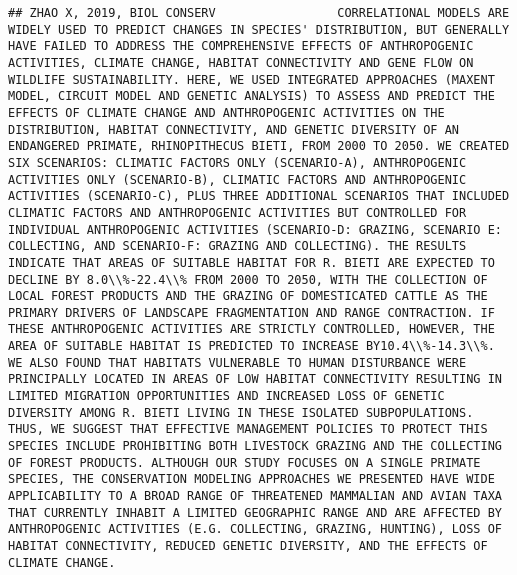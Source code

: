 \documentclass[]{article}
\begin{document}
\begin{verbatim}
## ZHAO X, 2019, BIOL CONSERV                 CORRELATIONAL MODELS ARE WIDELY USED TO PREDICT CHANGES IN SPECIES' DISTRIBUTION, BUT GENERALLY HAVE FAILED TO ADDRESS THE COMPREHENSIVE EFFECTS OF ANTHROPOGENIC ACTIVITIES, CLIMATE CHANGE, HABITAT CONNECTIVITY AND GENE FLOW ON WILDLIFE SUSTAINABILITY. HERE, WE USED INTEGRATED APPROACHES (MAXENT MODEL, CIRCUIT MODEL AND GENETIC ANALYSIS) TO ASSESS AND PREDICT THE EFFECTS OF CLIMATE CHANGE AND ANTHROPOGENIC ACTIVITIES ON THE DISTRIBUTION, HABITAT CONNECTIVITY, AND GENETIC DIVERSITY OF AN ENDANGERED PRIMATE, RHINOPITHECUS BIETI, FROM 2000 TO 2050. WE CREATED SIX SCENARIOS: CLIMATIC FACTORS ONLY (SCENARIO-A), ANTHROPOGENIC ACTIVITIES ONLY (SCENARIO-B), CLIMATIC FACTORS AND ANTHROPOGENIC ACTIVITIES (SCENARIO-C), PLUS THREE ADDITIONAL SCENARIOS THAT INCLUDED CLIMATIC FACTORS AND ANTHROPOGENIC ACTIVITIES BUT CONTROLLED FOR INDIVIDUAL ANTHROPOGENIC ACTIVITIES (SCENARIO-D: GRAZING, SCENARIO E: COLLECTING, AND SCENARIO-F: GRAZING AND COLLECTING). THE RESULTS INDICATE THAT AREAS OF SUITABLE HABITAT FOR R. BIETI ARE EXPECTED TO DECLINE BY 8.0\\%-22.4\\% FROM 2000 TO 2050, WITH THE COLLECTION OF LOCAL FOREST PRODUCTS AND THE GRAZING OF DOMESTICATED CATTLE AS THE PRIMARY DRIVERS OF LANDSCAPE FRAGMENTATION AND RANGE CONTRACTION. IF THESE ANTHROPOGENIC ACTIVITIES ARE STRICTLY CONTROLLED, HOWEVER, THE AREA OF SUITABLE HABITAT IS PREDICTED TO INCREASE BY10.4\\%-14.3\\%. WE ALSO FOUND THAT HABITATS VULNERABLE TO HUMAN DISTURBANCE WERE PRINCIPALLY LOCATED IN AREAS OF LOW HABITAT CONNECTIVITY RESULTING IN LIMITED MIGRATION OPPORTUNITIES AND INCREASED LOSS OF GENETIC DIVERSITY AMONG R. BIETI LIVING IN THESE ISOLATED SUBPOPULATIONS. THUS, WE SUGGEST THAT EFFECTIVE MANAGEMENT POLICIES TO PROTECT THIS SPECIES INCLUDE PROHIBITING BOTH LIVESTOCK GRAZING AND THE COLLECTING OF FOREST PRODUCTS. ALTHOUGH OUR STUDY FOCUSES ON A SINGLE PRIMATE SPECIES, THE CONSERVATION MODELING APPROACHES WE PRESENTED HAVE WIDE APPLICABILITY TO A BROAD RANGE OF THREATENED MAMMALIAN AND AVIAN TAXA THAT CURRENTLY INHABIT A LIMITED GEOGRAPHIC RANGE AND ARE AFFECTED BY ANTHROPOGENIC ACTIVITIES (E.G. COLLECTING, GRAZING, HUNTING), LOSS OF HABITAT CONNECTIVITY, REDUCED GENETIC DIVERSITY, AND THE EFFECTS OF CLIMATE CHANGE.

\end{verbatim}
\end{document}
